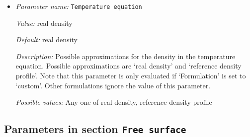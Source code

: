 \begin{itemize}
{\it Possible values:} Any one of incompressible, isothermal compression, reference density profile, implicit reference density profile, ask material model
\item {\it Parameter name:} {\tt Temperature equation}
\label{parameters:Formulation/Temperature equation}


{\it Value:} real density


{\it Default:} real density


{\it Description:} Possible approximations for the density in the temperature equation. Possible approximations are `real density' and `reference density profile'. Note that this parameter is only evaluated if `Formulation' is set to `custom'. Other formulations ignore the value of this parameter.


{\it Possible values:} Any one of real density, reference density profile
\end{itemize}

\subsection{Parameters in section \tt Free surface}
\label{parameters:Free_20surface}

